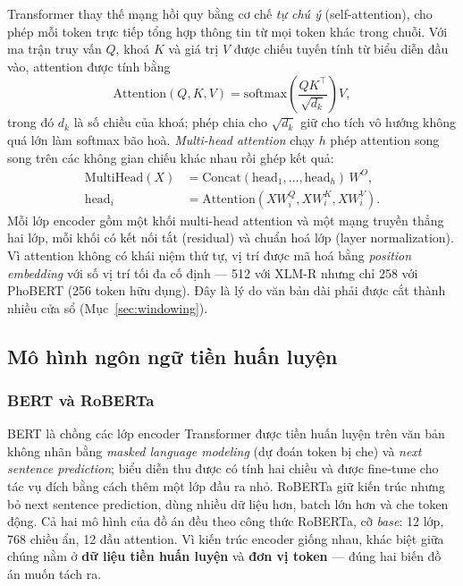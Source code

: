 Transformer \cite{vaswani2017attention} thay thế mạng hồi quy bằng cơ chế \emph{tự chú
ý} (self-attention), cho phép mỗi token trực tiếp tổng hợp thông tin từ mọi token khác
trong chuỗi. Với ma trận truy vấn $Q$, khoá $K$ và giá trị $V$ được chiếu tuyến tính từ
biểu diễn đầu vào, attention được tính bằng
\begin{equation}
  \mathrm{Attention}(Q, K, V) = \mathrm{softmax}\!\left( \frac{Q K^\top}{\sqrt{d_k}} \right) V,
\end{equation}
trong đó $d_k$ là số chiều của khoá; phép chia cho $\sqrt{d_k}$ giữ cho tích vô hướng
không quá lớn làm softmax bão hoà. \emph{Multi-head attention} chạy $h$ phép attention
song song trên các không gian chiếu khác nhau rồi ghép kết quả:
\begin{equation}
  \begin{aligned}
  \mathrm{MultiHead}(X) &= \mathrm{Concat}(\mathrm{head}_1, \dots, \mathrm{head}_h)\, W^O, \\
  \mathrm{head}_i &= \mathrm{Attention}(X W_i^Q, X W_i^K, X W_i^V).
  \end{aligned}
\end{equation}
Mỗi lớp encoder gồm một khối multi-head attention và một mạng truyền thẳng hai lớp, mỗi
khối có kết nối tắt (residual) và chuẩn hoá lớp (layer normalization). Vì attention
không có khái niệm thứ tự, vị trí được mã hoá bằng \emph{position embedding} với số vị
trí tối đa cố định --- 512 với XLM-R nhưng chỉ 258 với PhoBERT (256 token hữu dụng). Đây là lý do
văn bản dài phải được cắt thành nhiều cửa sổ (Mục~\ref{sec:windowing}).

\subsection{Mô hình ngôn ngữ tiền huấn luyện}
\label{sec:plm}

\subsubsection{BERT và RoBERTa}

BERT \cite{devlin2019bert} là chồng các lớp encoder Transformer được tiền huấn luyện trên
văn bản không nhãn bằng \emph{masked language modeling} (dự đoán token bị che) và
\emph{next sentence prediction}; biểu diễn thu được có tính hai chiều và được fine-tune cho
tác vụ đích bằng cách thêm một lớp đầu ra nhỏ. RoBERTa \cite{liu2019roberta} giữ kiến trúc
nhưng bỏ next sentence prediction, dùng nhiều dữ liệu hơn, batch lớn hơn và che token động.
Cả hai mô hình của đồ án đều theo công thức RoBERTa, cỡ \emph{base}: 12 lớp, 768 chiều ẩn,
12 đầu attention. Vì kiến trúc encoder giống nhau, khác biệt giữa chúng nằm ở \textbf{dữ liệu
tiền huấn luyện} và \textbf{đơn vị token} --- đúng hai biến đồ án muốn tách ra.

